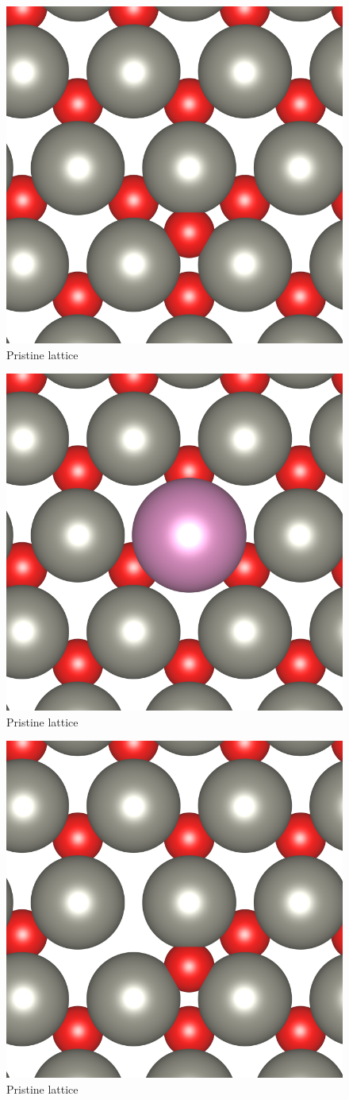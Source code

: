 \begin{figure}[tbh!]
	\centering
	\includegraphics[width=0.48\linewidth]{"images/rrl/interstitial"}
	\caption[Pristine lattice]{Pristine lattice}
\end{figure}

\begin{figure}[tbh!]
	\centering
	\includegraphics[width=0.48\linewidth]{"images/rrl/substitutional"}
	\caption[Pristine lattice]{Pristine lattice}
\end{figure}

\begin{figure}[tbh!]
	\centering
	\includegraphics[width=0.48\linewidth]{"images/rrl/frenkel"}
	\caption[Pristine lattice]{Pristine lattice}
\end{figure}

